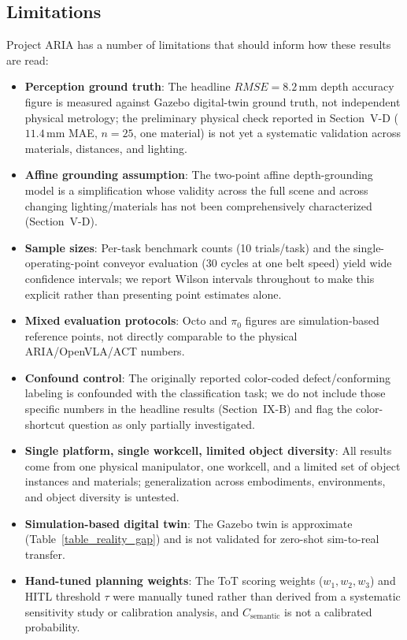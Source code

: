 \documentclass[journal]{IEEEtran}
\begin{document}
\subsection{Limitations}
Project ARIA has a number of limitations that should inform how these results are read:
\begin{itemize}
    \item \textbf{Perception ground truth}: The headline $RMSE=8.2$\,mm depth accuracy figure is measured against Gazebo digital-twin ground truth, not independent physical metrology; the preliminary physical check reported in Section~V-D ($11.4$\,mm MAE, $n=25$, one material) is not yet a systematic validation across materials, distances, and lighting.
    \item \textbf{Affine grounding assumption}: The two-point affine depth-grounding model is a simplification whose validity across the full scene and across changing lighting/materials has not been comprehensively characterized (Section~V-D).
    \item \textbf{Sample sizes}: Per-task benchmark counts (10 trials/task) and the single-operating-point conveyor evaluation (30 cycles at one belt speed) yield wide confidence intervals; we report Wilson intervals throughout to make this explicit rather than presenting point estimates alone.
    \item \textbf{Mixed evaluation protocols}: Octo and $\pi_0$ figures are simulation-based reference points, not directly comparable to the physical ARIA/OpenVLA/ACT numbers.
    \item \textbf{Confound control}: The originally reported color-coded defect/conforming labeling is confounded with the classification task; we do not include those specific numbers in the headline results (Section~IX-B) and flag the color-shortcut question as only partially investigated.
    \item \textbf{Single platform, single workcell, limited object diversity}: All results come from one physical manipulator, one workcell, and a limited set of object instances and materials; generalization across embodiments, environments, and object diversity is untested.
    \item \textbf{Simulation-based digital twin}: The Gazebo twin is approximate (Table~\ref{table_reality_gap}) and is not validated for zero-shot sim-to-real transfer.
    \item \textbf{Hand-tuned planning weights}: The ToT scoring weights ($w_1,w_2,w_3$) and HITL threshold $\tau$ were manually tuned rather than derived from a systematic sensitivity study or calibration analysis, and $C_{\text{semantic}}$ is not a calibrated probability.

\end{itemize}
\end{document}
